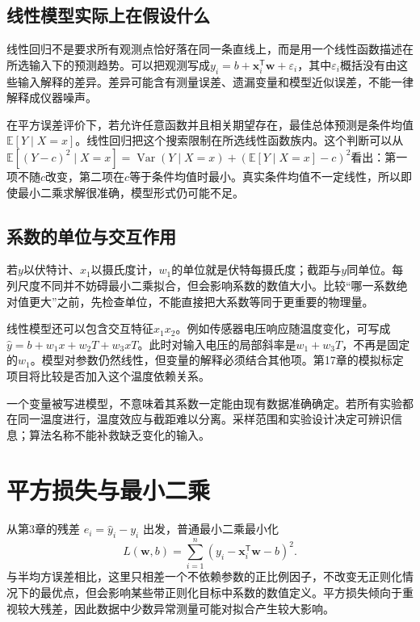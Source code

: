 \subsection{线性模型实际上在假设什么}
线性回归不是要求所有观测点恰好落在同一条直线上，而是用一个线性函数描述在所选输入下的预测趋势。可以把观测写成$y_i=b+\mathbf x_i^{\mathsf T}\mathbf w+\varepsilon_i$，其中$\varepsilon_i$概括没有由这些输入解释的差异。差异可能含有测量误差、遗漏变量和模型近似误差，不能一律解释成仪器噪声。

在平方误差评价下，若允许任意函数并且相关期望存在，最佳总体预测是条件均值$\mathbb E[Y\mid X=x]$。线性回归把这个搜索限制在所选线性函数族内。这个判断可以从$\mathbb E[(Y-c)^2\mid X=x]=\operatorname{Var}(Y\mid X=x)+(\mathbb E[Y\mid X=x]-c)^2$看出：第一项不随$c$改变，第二项在$c$等于条件均值时最小。真实条件均值不一定线性，所以即使最小二乘求解很准确，模型形式仍可能不足。

\subsection{系数的单位与交互作用}
若$y$以伏特计、$x_1$以摄氏度计，$w_1$的单位就是伏特每摄氏度；截距与$y$同单位。每列尺度不同并不妨碍最小二乘拟合，但会影响系数的数值大小。比较“哪一系数绝对值更大”之前，先检查单位，不能直接把大系数等同于更重要的物理量。

线性模型还可以包含交互特征$x_1x_2$。例如传感器电压响应随温度变化，可写成$\hat y=b+w_1x+w_2T+w_3xT$。此时对输入电压的局部斜率是$w_1+w_3T$，不再是固定的$w_1$。模型对参数仍然线性，但变量的解释必须结合其他项。第17章的模拟标定项目将比较是否加入这个温度依赖关系。

一个变量被写进模型，不意味着其系数一定能由现有数据准确确定。若所有实验都在同一温度进行，温度效应与截距难以分离。采样范围和实验设计决定可辨识信息；算法名称不能补救缺乏变化的输入。

\section{平方损失与最小二乘}
从第3章的残差 $e_i=\hat y_i-y_i$ 出发，普通最小二乘最小化
\begin{equation}
L(\mathbf w,b)=\sum_{i=1}^n(y_i-\mathbf x_i^{\mathsf T}\mathbf w-b)^2.
\end{equation}
与半均方误差相比，这里只相差一个不依赖参数的正比例因子，不改变无正则化情况下的最优点，但会影响某些带正则化目标中系数的数值定义。平方损失倾向于重视较大残差，因此数据中少数异常测量可能对拟合产生较大影响。

